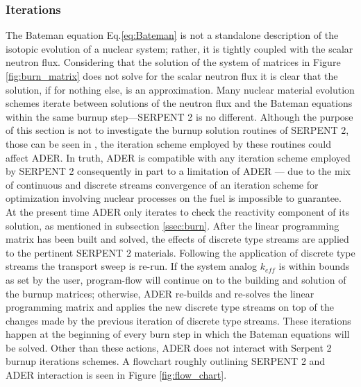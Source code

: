 \subsubsection{Iterations} \label{sssec:iter}
The Bateman equation Eq.\ref{eq:Bateman} is not a standalone description of the
isotopic evolution of a nuclear system; rather, it is tightly coupled with the
scalar neutron flux. Considering that the solution of the system of matrices
in Figure \ref{fig:burn_matrix} does not solve for the scalar neutron flux
it is clear that the solution, if for nothing else, is an approximation. Many
nuclear material evolution schemes iterate between solutions of the neutron
flux and the Bateman equations within the same burnup step---SERPENT 2 is no 
different. Although the purpose of
this section is not to investigate the burnup solution routines of SERPENT 2, 
those
can be seen in \cite{leppanen_burnup_2009}, the iteration scheme employed by
these routines could affect ADER. In truth, ADER is compatible with any
iteration scheme employed by SERPENT 2 consequently in part to a limitation 
of ADER ---
due to the mix of continuous and discrete streams convergence of an iteration
scheme for optimization involving nuclear processes on the fuel is impossible
to guarantee. At the present time ADER only iterates to check the reactivity 
component of its solution, as mentioned in subsection \ref{ssec:burn}. 
After the linear programming
matrix has been built and solved, the effects of discrete type streams are
applied to the pertinent SERPENT 2 materials. Following the application 
of discrete type streams the transport sweep is re-run. If the system analog 
$k_{eff}$ is within bounds as set by the user, program-flow will continue on to
the building and solution of the burnup matrices; otherwise, ADER re-builds
and re-solves the linear programming matrix and applies the new discrete type
streams on top of the changes made by the previous iteration of discrete 
type streams. These iterations happen at the beginning of every burn step in 
which the Bateman equations will be solved. Other than these actions, ADER 
does not
interact with Serpent 2 burnup iterations schemes. A flowchart roughly outlining
SERPENT 2 and ADER interaction is seen in Figure \ref{fig:flow_chart}.

